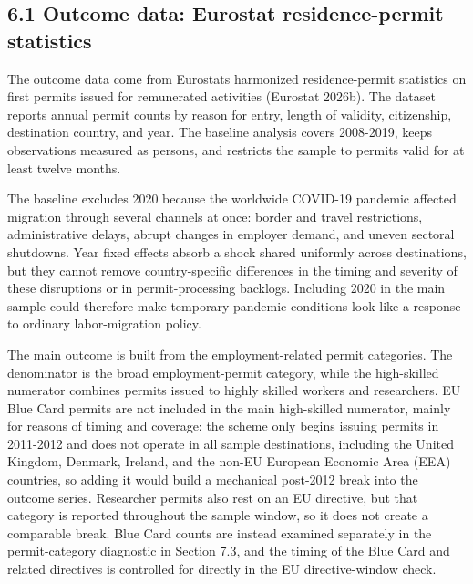 \documentclass[11pt,a4paper]{article}
\begin{document}
\subsection{6.1 Outcome data: Eurostat residence-permit
statistics}\label{outcome-data-eurostat-residence-permit-statistics}

The outcome data come from Eurostat\textquotesingle s harmonized
residence-permit statistics on first permits issued for remunerated
activities (Eurostat 2026b). The dataset reports annual permit counts by
reason for entry, length of validity, citizenship, destination country,
and year. The baseline analysis covers 2008-2019, keeps observations
measured as persons, and restricts the sample to permits valid for at
least twelve months.

The baseline excludes 2020 because the worldwide COVID-19 pandemic
affected migration through several channels at once: border and travel
restrictions, administrative delays, abrupt changes in employer demand,
and uneven sectoral shutdowns. Year fixed effects absorb a shock shared
uniformly across destinations, but they cannot remove country-specific
differences in the timing and severity of these disruptions or in
permit-processing backlogs. Including 2020 in the main sample could
therefore make temporary pandemic conditions look like a response to
ordinary labor-migration policy.

The main outcome is built from the employment-related permit categories.
The denominator is the broad employment-permit category, while the
high-skilled numerator combines permits issued to highly skilled workers
and researchers. EU Blue Card permits are not included in the main
high-skilled numerator, mainly for reasons of timing and coverage: the
scheme only begins issuing permits in 2011-2012 and does not operate in
all sample destinations, including the United Kingdom, Denmark, Ireland,
and the non-EU European Economic Area (EEA) countries, so adding it
would build a mechanical post-2012 break into the outcome series.
Researcher permits also rest on an EU directive, but that category is
reported throughout the sample window, so it does not create a
comparable break. Blue Card counts are instead examined separately in
the permit-category diagnostic in Section 7.3, and the timing of the
Blue Card and related directives is controlled for directly in the EU
directive-window check.
\end{document}
